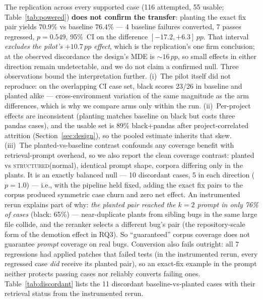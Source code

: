 \documentclass[10pt,conference]{IEEEtran}
\newcommand{\structured}{\textsc{structured}\xspace}
\newcommand{\pp}{\,pp}
\begin{document}
The replication across every supported case (116 attempted, 55 usable;
Table~\ref{tab:powered}) \textbf{does not confirm the transfer}: planting
the exact fix pair yields $70.9\%$ vs baseline $76.4\%$ --- 4 baseline
failures converted, 7 passes regressed, $p{=}0.549$, 95\%~CI on the
difference $[-17.2, +6.3]\pp$. That interval \emph{excludes the pilot's
$+10.7\pp$ effect}, which is the replication's one firm conclusion; at the
observed discordance the design's MDE is ${\sim}16\pp$, so small effects in
either direction remain undetectable, and we do not claim a confirmed
null. Three observations bound the interpretation further. (i)~The pilot
itself did not reproduce: on the overlapping CI case set, black scores
23/26 in baseline and planted alike --- cross-environment variation of the
same magnitude as the arm differences, which is why we compare arms only
within the run. (ii)~Per-project effects are inconsistent (planting
matches baseline on black but costs three pandas cases), and the usable
set is 89\% black+pandas after project-correlated attrition
(Section~\ref{sec:design}), so the pooled estimate inherits that skew.
(iii)~The planted-vs-baseline contrast confounds any coverage benefit with
retrieval-prompt overhead, so we also report the clean coverage contrast:
planted vs \structured(normal), identical prompt shape, corpora differing
only in the plants. It is an exactly balanced null --- 10 discordant cases,
5 in each direction ($p{=}1.0$) --- i.e., with the pipeline held fixed,
adding the exact fix pairs to the corpus produced symmetric case churn and
zero net effect. An instrumented rerun explains part of why: \emph{the
planted pair reached the $k{=}2$ prompt in only 76\% of cases} (black:
65\%) --- near-duplicate plants from sibling bugs in the same large file
collide, and the reranker selects a different bug's pair (the
repository-scale form of the demotion effect in RQ3). So ``guaranteed''
corpus coverage does not guarantee \emph{prompt} coverage on real bugs.
Conversion also fails outright: all 7 regressions had applied patches that
failed tests (in the instrumented rerun, every regressed case \emph{did}
receive its planted pair), so an exact-fix example in the prompt neither
protects passing cases nor reliably converts failing ones. Table~\ref{tab:discordant} lists the 11 discordant baseline-vs-planted
cases with their retrieval status from the instrumented rerun.
\end{document}
